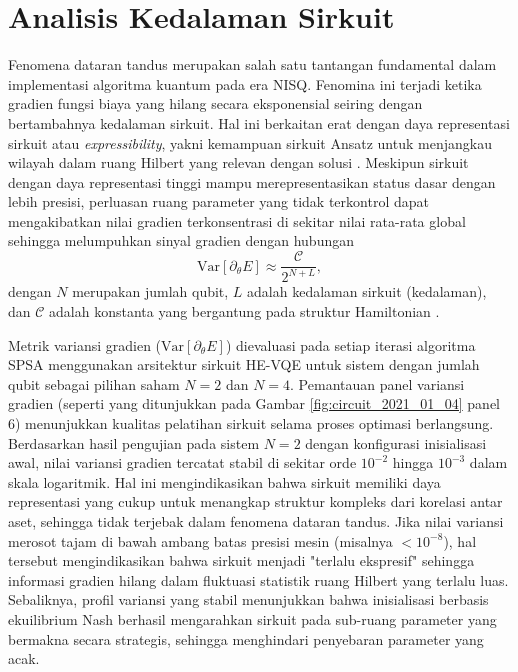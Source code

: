 \section{Analisis Kedalaman Sirkuit}
\label{sec:4_8_depth_analysis}

Fenomena dataran tandus merupakan salah satu tantangan fundamental dalam implementasi algoritma kuantum pada era NISQ. Fenomina ini terjadi ketika gradien fungsi biaya yang hilang secara eksponensial seiring dengan bertambahnya kedalaman sirkuit. Hal ini berkaitan erat dengan daya representasi sirkuit atau \textit{expressibility}, yakni kemampuan sirkuit Ansatz untuk menjangkau wilayah dalam ruang Hilbert yang relevan dengan solusi . Meskipun sirkuit dengan daya representasi tinggi mampu merepresentasikan status dasar dengan lebih presisi, perluasan ruang parameter yang tidak terkontrol dapat mengakibatkan nilai gradien terkonsentrasi di sekitar nilai rata-rata global sehingga melumpuhkan sinyal gradien dengan hubungan 
\begin{equation}
    \text{Var}[\partial_{\theta} E] \approx \frac{\mathcal{C}}{2^{N+L}},
    \label{eq:4_8_gradient_variance}
\end{equation}
dengan $N$ merupakan jumlah qubit, $L$ adalah kedalaman sirkuit (kedalaman), dan $\mathcal{C}$ adalah konstanta yang bergantung pada struktur Hamiltonian .

Metrik variansi gradien ($\text{Var}[\partial_{\theta} E]$) dievaluasi pada setiap iterasi algoritma SPSA menggunakan arsitektur sirkuit HE-VQE untuk sistem dengan jumlah qubit sebagai pilihan saham $N=2$ dan $N=4$. Pemantauan panel variansi gradien (seperti yang ditunjukkan pada Gambar \ref{fig:circuit_2021_01_04} panel 6) menunjukkan kualitas pelatihan sirkuit selama proses optimasi berlangsung. Berdasarkan hasil pengujian pada sistem $N=2$ dengan konfigurasi inisialisasi awal, nilai variansi gradien tercatat stabil di sekitar orde $10^{-2}$ hingga $10^{-3}$ dalam skala logaritmik. Hal ini mengindikasikan bahwa sirkuit memiliki daya representasi yang cukup untuk menangkap struktur kompleks dari korelasi antar aset, sehingga tidak terjebak dalam fenomena dataran tandus. Jika nilai variansi merosot tajam di bawah ambang batas presisi mesin (misalnya $< 10^{-8}$), hal tersebut mengindikasikan bahwa sirkuit menjadi "terlalu ekspresif" sehingga informasi gradien hilang dalam fluktuasi statistik ruang Hilbert yang terlalu luas. Sebaliknya, profil variansi yang stabil menunjukkan bahwa inisialisasi berbasis ekuilibrium Nash berhasil mengarahkan sirkuit pada sub-ruang parameter yang bermakna secara strategis, sehingga menghindari penyebaran parameter yang acak.

